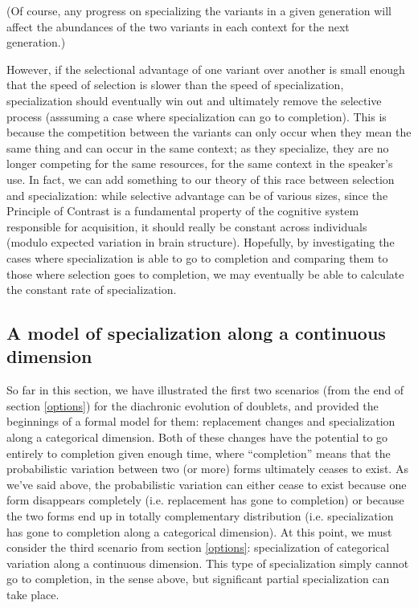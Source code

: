 (Of course, any progress on specializing the variants in a given generation will affect the abundances of the two variants in each context for the next generation.)


However, if the selectional advantage of one variant over another is small enough that the speed of selection is slower than the speed of specialization, specialization should eventually win out and ultimately remove the selective process (asssuming a case where specialization can go to completion).
This is because the competition between the variants can only occur when they mean the same thing and can occur in the same context; as they specialize, they are no longer competing for the same resources, for the same context in the speaker's use.
In fact, we can add something to our theory of this race between selection and specialization: while selective advantage can be of various sizes, since the Principle of Contrast is a fundamental property of the cognitive system responsible for acquisition, it should really be constant across individuals (modulo expected variation in brain structure).
Hopefully, by investigating the cases where specialization is able to go to completion and comparing them to those where selection goes to completion, we may eventually be able to calculate the constant rate of specialization.


\subsection{A model of specialization along a continuous dimension}

So far in this section, we have illustrated the first two scenarios (from the end of section \ref{options}) for the diachronic evolution of doublets, and provided the beginnings of a formal model for them: replacement changes and specialization along a categorical dimension.
Both of these changes have the potential to go entirely to completion given enough time, where ``completion'' means that the probabilistic variation between two (or more) forms ultimately ceases to exist.
As we've said above, the probabilistic variation can either cease to exist because one form disappears completely (i.e. replacement has gone to completion) or because the two forms end up in totally complementary distribution (i.e. specialization has gone to completion along a categorical dimension).
At this point, we must consider the third scenario from section \ref{options}: specialization of categorical variation along a continuous dimension.
This type of specialization simply cannot go to completion, in the sense above, but significant partial specialization can take place.


